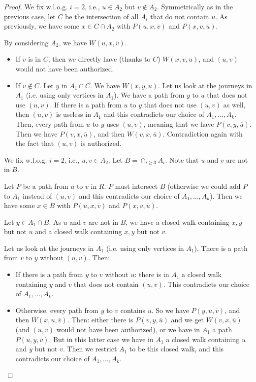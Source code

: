 \documentclass[10pt,a4paper]{amsart}
\begin{document}
\begin{proof}
We fix w.l.o.g. $i=2$, i.e., $u\in A_2$ but $v\not\in A_2$. Symmetrically as in the previous case, let $C$ be the intersection of all $A_i$ that do not contain $u$.
As previously, we have some $x\in C\cap A_2$ with $P(u,x,\overline{v})$ and $P(x,v,\overline{u})$. 
 
By considering $A_2$, we have $W(u,x,\overline{v})$. 
\begin{itemize}
	\item If $v$ is in $C$, then we directly have (thanks to $C$) $W(x,v,\overline{u})$, and $(u,v)$ would not have been authorized.
	\item If $v\not\in C$. Let $y$ in $A_1\cap C$. We have $W(x,y,\overline{u})$. Let us look at the journeys in $A_1$ (i.e. using only vertices in $A_1$). We have a path from $y$ to $u$ that does not use $(u,v)$. If there is a path from $u$ to $y$ that does not use $(u,v)$ as well, then $(u,v)$ is useless in $A_1$ and this contradicts our choice of $A_1,\dots, A_k$. Then, every path from $u$ to $y$ uses $(u,v)$, meaning that we have $P(v,y,\overline{u})$. Then we have $P(v,x,\overline{u})$, and then $W(v,x,\overline{u})$. Contradiction again with the fact that $(u,v)$ is authorized. \\
\end{itemize}
 
 

We fix w.l.o.g. $i=2$, i.e., $u,v\in A_2$. Let $B=\cap_{i\geq 3} A_i$. Note that $u$ and $v$ are not in $B$.

Let $P$ be a path from $u$ to $v$ in $R$. $P$ must intersect $B$ (otherwise we could add $P$ to $A_1$ instead of $(u,v)$ and this contradicts our choice of $A_1,\dots, A_k$). Then we have some $x\in B$ with $P(u,x,\overline{v})$ and $P(x,v,\overline{u})$. 

Let $y\in A_1\cap B$. As $u$ and $v$ are not in $B$, we have a closed walk containing $x,y$ but not $u$ and a closed walk containing $x,y$ but not $v$. 

Let us look at the journeys in $A_1$ (i.e. using only vertices in $A_1$). There is a path from $v$ to $y$ without $(u,v)$. Then:
\begin{itemize}
\item If there is a path from $y$ to $v$ without $u$: there is in $A_1$ a closed walk containing $y$ and $v$ that does not contain $(u,v)$. This contradicts our choice of $A_1,\dots, A_k$. 
\item Otherwise, every path from $y$ to $v$ contains $u$. So we have $P(y,u,\overline{v})$, and then $W(x,u,\overline{v})$. Then: either there is $P(v,y,\overline{u})$ and we get $W(v,x,\overline{u})$ (and $(u,v)$ would not have been authorized), or we have in $A_1$ a path $P(u,y,\overline{v})$. But in this latter case we have in $A_1$ a closed walk containing $u$ and $y$ but not $v$. Then we restrict $A_1$ to be this closed walk, and this contradicts our choice of $A_1,\dots, A_k$. \qedhere


\end{itemize}
\end{proof}
\end{document}
